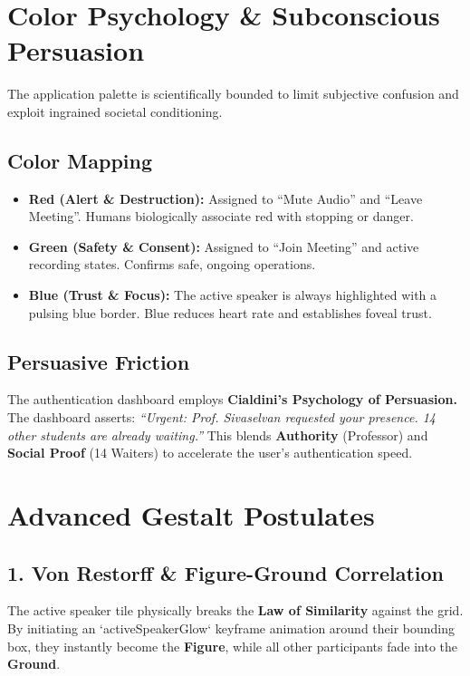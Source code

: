 \documentclass[12pt,a4paper]{article}
\begin{document}
\section{Color Psychology \& Subconscious Persuasion}

The application palette is scientifically bounded to limit subjective confusion and exploit ingrained societal conditioning.

\subsection{Color Mapping}
\begin{itemize}
    \item \textbf{Red (Alert \& Destruction):} Assigned to ``Mute Audio'' and ``Leave Meeting''. Humans biologically associate red with stopping or danger.
    \item \textbf{Green (Safety \& Consent):} Assigned to ``Join Meeting'' and active recording states. Confirms safe, ongoing operations.
    \item \textbf{Blue (Trust \& Focus):} The active speaker is always highlighted with a pulsing blue border. Blue reduces heart rate and establishes foveal trust.
\end{itemize}

\subsection{Persuasive Friction}
The authentication dashboard employs \textbf{Cialdini’s Psychology of Persuasion.} The dashboard asserts: \textit{``Urgent: Prof. Sivaselvan requested your presence. 14 other students are already waiting.''} This blends \textbf{Authority} (Professor) and \textbf{Social Proof} (14 Waiters) to accelerate the user's authentication speed.

\newpage

\section{Advanced Gestalt Postulates}

\subsection{1. Von Restorff \& Figure-Ground Correlation}
The active speaker tile physically breaks the \textbf{Law of Similarity} against the grid. By initiating an `activeSpeakerGlow` keyframe animation around their bounding box, they instantly become the \textbf{Figure}, while all other participants fade into the \textbf{Ground}. 
\end{document}
